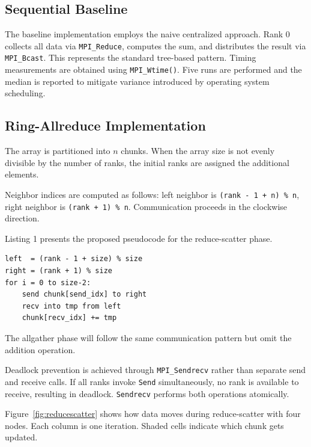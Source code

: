 \documentclass[12pt,a4paper]{article}
\begin{document}
\subsection{Sequential Baseline}

The baseline implementation employs the naive centralized approach. Rank 0 collects all data via \texttt{MPI\_Reduce}, computes the sum, and distributes the result via \texttt{MPI\_Bcast}. This represents the standard tree-based pattern. Timing measurements are obtained using \texttt{MPI\_Wtime()}. Five runs are performed and the median is reported to mitigate variance introduced by operating system scheduling.

\subsection{Ring-Allreduce Implementation}

The array is partitioned into $n$ chunks. When the array size is not evenly divisible by the number of ranks, the initial ranks are assigned the additional elements.

Neighbor indices are computed as follows: left neighbor is \texttt{(rank - 1 + n) \% n}, right neighbor is \texttt{(rank + 1) \% n}. Communication proceeds in the clockwise direction.

Listing 1 presents the proposed pseudocode for the reduce-scatter phase.

\begin{lstlisting}[caption={Proposed reduce-scatter pseudocode},label={lst:ring}]
left  = (rank - 1 + size) % size
right = (rank + 1) % size
for i = 0 to size-2:
    send chunk[send_idx] to right
    recv into tmp from left
    chunk[recv_idx] += tmp
\end{lstlisting}

The allgather phase will follow the same communication pattern but omit the addition operation.

Deadlock prevention is achieved through \texttt{MPI\_Sendrecv} rather than separate send and receive calls. If all ranks invoke \texttt{Send} simultaneously, no rank is available to receive, resulting in deadlock. \texttt{Sendrecv} performs both operations atomically.

Figure~\ref{fig:reducescatter} shows how data moves during reduce-scatter with four nodes. Each column is one iteration. Shaded cells indicate which chunk gets updated.
\end{document}
